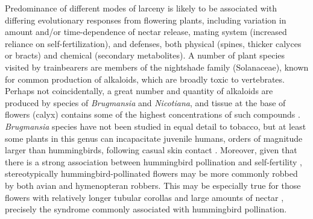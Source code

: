 \documentclass[fleqn,10pt,lineno]{wlpeerj}
\begin{document}
%
%

Predominance of different modes of larceny is likely to be associated with differing evolutionary responses from flowering plants, including variation in amount and/or time-dependence of nectar release, mating system (increased reliance on self-fertilization), and defenses, both physical (spines, thicker calyces or bracts) and chemical (secondary metabolites). 
A number of plant species visited by trainbearers are members of the nightshade family (Solanaceae), known for common production of alkaloids, which are broadly toxic to vertebrates. 
Perhaps not coincidentally, a great number and quantity of alkaloids are produced by species of \textit{Brugmansia} and \textit{Nicotiana}, and tissue at the base of flowers (calyx) contains some of the highest concentrations of such compounds \citep{saitoh1985, alves2007}. 
\textit{Brugmansia} species have not been studied in equal detail to tobacco, but at least some plants in this genus can incapacitate juvenile humans, orders of magnitude larger than hummingbirds, following casual skin contact \citep{andreola2008}. 
Moreover, given that there is a strong association between hummingbird pollination and self-fertility \citep{wolowski2013}, stereotypically hummingbird-pollinated flowers may be more commonly robbed by both avian and hymenopteran robbers. 
This may be especially true for those flowers with relatively longer tubular corollas and large amounts of nectar \citep{lara2001,rojas-nossa2016}, precisely the syndrome commonly associated with hummingbird pollination.


%
%

%
%
%


%
%
\end{document}
